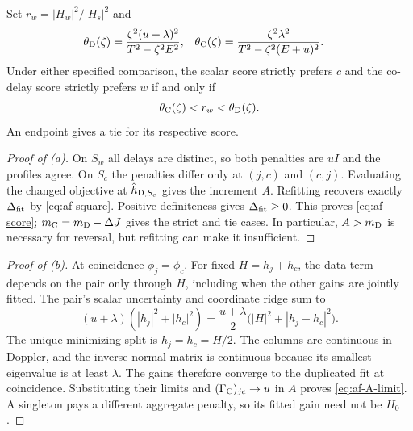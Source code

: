 \begin{afdmprop}
Set $r_w=|H_w|^2/|H_s|^2$ and
\begin{align}
 \theta_{\rm D}(\zeta)
 &=\frac{\zeta^2(u+\lambda)^2}{T^2-\zeta^2E^2},&
 \theta_{\rm C}(\zeta)
 &=\frac{\zeta^2\lambda^2}{T^2-\zeta^2(E+u)^2}.
 \label{eq:af-window}
\end{align}
Under either specified comparison, the scalar score strictly prefers
$c$ and the co-delay score strictly prefers $w$ if and only if
\[
                 \theta_{\rm C}(\zeta)<r_w<\theta_{\rm D}(\zeta).
\]
An endpoint gives a tie for its respective score.
\end{afdmprop}

\begin{proof}[Proof of \textup{(a)}]
On $S_w$ all delays are distinct, so both penalties are $uI$ and
the profiles agree. On $S_c$ the penalties differ only at $(j,c)$
and $(c,j)$. Evaluating the changed objective at $\hat h_{{\rm D},S_c}$
gives the increment $A$. Refitting recovers exactly $\Delta_{\rm fit}$
by \eqref{eq:af-square}. Positive definiteness gives
$\Delta_{\rm fit}\ge0$. This proves \eqref{eq:af-score};
$m_{\rm C}=m_{\rm D}-\Delta J$ gives the strict and tie cases.
In particular, $A>m_{\rm D}$ is necessary for reversal, but refitting
can make it insufficient.
\end{proof}

\begin{proof}[Proof of \textup{(b)}]
At coincidence $\phi_j=\phi_c$. For fixed $H=h_j+h_c$, the data term
depends on the pair only through $H$, including when the other gains
are jointly fitted. The pair's scalar uncertainty and coordinate
ridge sum to
\[
 (u+\lambda)(|h_j|^2+|h_c|^2)
 =\frac{u+\lambda}{2}\bigl(|H|^2+|h_j-h_c|^2\bigr).
\]
The unique minimizing split is $h_j=h_c=H/2$. The columns are
continuous in Doppler, and the inverse normal matrix is continuous
because its smallest eigenvalue is at least $\lambda$. The gains
therefore converge to the duplicated fit at coincidence. Substituting
their limits and $(\Gamma_{\rm C})_{jc}\to u$ in $A$ proves
\eqref{eq:af-A-limit}. A singleton pays a different aggregate penalty,
so its fitted gain need not be $H_0$.
\end{proof}

